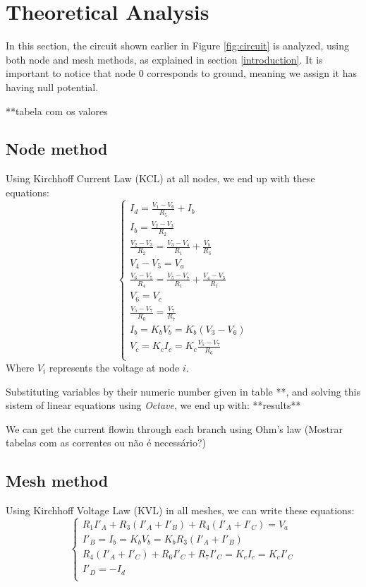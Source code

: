 \section{Theoretical Analysis}
\label{sec:analysis}

In this section, the circuit shown earlier in Figure \ref{fig:circuit} is analyzed, using both node and mesh methods, as explained in section \ref{introduction}. It is important to notice that node 0 corresponds to ground, meaning we assign it has having null potential.
\par
**tabela com os valores

\subsection{Node method}
Using Kirchhoff Current Law (KCL) at all nodes, we end up with these equations:
\begin{equation*}
\begin{cases}
  I_d = \frac{V_1 - V_6}{R_5} + I_b \\
  I_b = \frac{V_2 - V_3}{R_2} \\
  \frac{V_2 - V_3}{R_2} = \frac{V_3 - V_4}{R_1} + \frac{V_b}{R_3} \\
  V_4 - V_5 = V_a \\
  \frac{V_6 - V_5}{R_4} = \frac{V_5 - V_7}{R_1} + \frac{V_4 - V_3}{R_1} \\ %
  V_6 = V_c \\
  \frac{V_5 - V_7}{R_6} = \frac{V_7}{R_7} \\
  I_b = K_bV_b = K_b(V_3 - V_6) \\
  V_c = K_cI_c = K_c \frac{V_5 - V_7}{R_6} \\
\end{cases}
\end{equation*}
Where $V_i$ represents the voltage at node $i$.
\par
Substituting variables by their numeric number given in table **, and solving this sistem of linear equations using \textit{Octave}, we end up with: **results**
\par
We can get the current flowin through each branch using Ohm's law
(Mostrar tabelas com as correntes ou não é necessário?)

\subsection{Mesh method}
Using Kirchhoff Voltage Law (KVL) in all meshes, we can write these equations:
\begin{equation*}
\begin{cases}
  R_1I'_A + R_3(I'_A + I'_B) + R_4(I'_A + I'_C) = V_a \\
  I'_B = I_b = K_bV_b = K_bR_3(I'_A + I'_B) \\
  R_4(I'_A+I'_C) + R_6I'_C + R_7I'_C = K_cI_c = K_cI'_C \\
  I'_D = -I_d \\
\end{cases}
\end{equation*}






